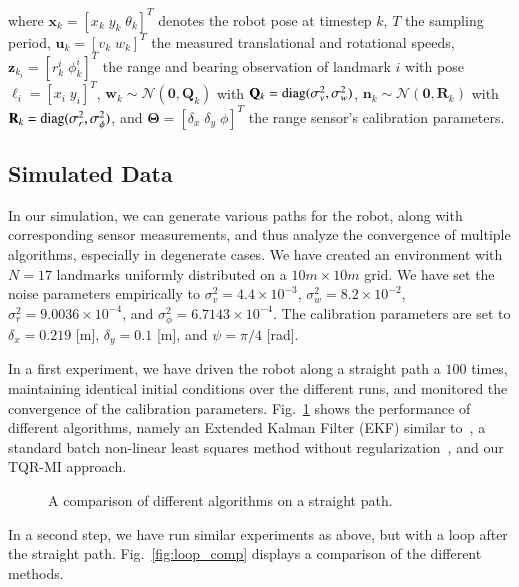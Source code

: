 \noindent where $\mathbf{x}_k=[x_k\;y_k\;\theta_k]^T$ denotes the robot pose at
timestep $k$, $T$ the sampling period, $\mathbf{u}_k=[v_k\;w_k]^T$ the measured
translational and rotational speeds, $\mathbf{z}_{k_i}=[r_k^i\;\phi_k^i]^T$ the
range and bearing observation of landmark $i$ with pose
$\boldsymbol{\ell}_i=[x_i\;y_i]^T$, $\mathbf{w}_k\sim\mathcal{N}(\mathbf{0},
\mathbf{Q}_k)$ with $\mathbf{Q}_k=\operatorname{diag}(\sigma^2_v,\sigma^2_w)$,
$\mathbf{n}_k\sim\mathcal{N}(\mathbf{0}, \mathbf{R}_k)$ with
$\mathbf{R}_k=\operatorname{diag}(\sigma^2_r,\sigma^2_\phi)$, and
$\mathbf{\Theta}=[\delta_x\;\delta_y\;\phi]^T$ the range sensor's calibration
parameters.

\subsection{Simulated Data}

In our simulation, we can generate various paths for the robot, along with
corresponding sensor measurements, and thus analyze the convergence of multiple
algorithms, especially in degenerate cases. We have created an environment
with $N=17$ landmarks uniformly distributed on a $10m\times 10m$ grid. We have
set the noise parameters empirically to $\sigma^2_v=4.4\times 10^{-3}$,
$\sigma^2_w=8.2\times 10^{-2}$, $\sigma^2_r=9.0036\times 10^{-4}$, and
$\sigma^2_\phi=6.7143\times 10^{-4}$. The calibration parameters are set to
$\delta_x=0.219$ [m], $\delta_y=0.1$ [m], and $\psi=\pi/4$ [rad].

In a first experiment, we have driven the robot along a straight path a $100$
times, maintaining identical initial conditions over the different runs, and
monitored the convergence of the calibration parameters.
Fig.~\ref{fig:straight_comp} shows the performance of different algorithms,
namely an Extended Kalman Filter (EKF) similar to~\cite{martinelli06automatic},
a standard batch non-linear least squares method without
regularization~\cite{kuemmerle11simultaneous}, and our TQR-MI approach.


\begin{figure}[t]
\centering
{}
\caption{A comparison of different algorithms on a straight path.}
\label{fig:straight_comp}
\end{figure}

In a second step, we have run similar experiments as above, but with a loop
after the straight path. Fig.~\ref{fig:loop_comp} displays a comparison of the
different methods.

